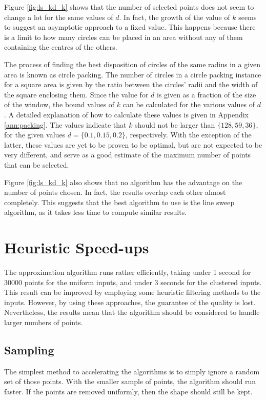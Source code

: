 \begin{change}
Figure \ref{fig:ls_kd_k} shows  that the number of selected points does not seem to change a lot for the same values of $d$. In fact, the growth of the value of $k$ seems to suggest an asymptotic approach to a fixed value. This happens because there is a limit to how many circles can be placed in an area without any of them containing the centres of the others. 
	
The process of finding the best disposition of circles of the same radius in a given area is known as circle packing. The number of circles in a circle packing instance for a square area is given by the ratio between the circles' radii and the width of the square enclosing them. Since the value for $d$ is given as a fraction of the size of the window, the bound values of $k$ can be calculated for the various values of $d$. A detailed explanation of how to calculate these values is given in Appendix \ref{ann:packing}. The values indicate that $k$ should not be larger than $\{128,59,36\}$, for the given values $d=\{0.1,0.15,0.2\}$, respectively. With the exception of the latter, these values are yet to be proven to be optimal, but are not expected to be very different, and serve as a good estimate of the maximum number of points that can be selected.
\end{change}

Figure \ref{fig:ls_kd_k} also shows that no algorithm has the advantage on the number of points chosen. In fact, the results overlap each other almost completely. This suggests that the best algorithm to use is the line sweep algorithm, as it takes less time to compute similar results.


\section{Heuristic Speed-ups}
The approximation algorithm runs rather efficiently, taking under 1 second for 30000 points for the uniform inputs, and under 3 seconds for the clustered inputs. This result can be improved by employing some heuristic filtering methods to the inputs. However, by using these approaches, the guarantee of the quality is lost. Nevertheless, the results mean that the algorithm should be considered to handle larger numbers of points.
\subsection{Sampling}
The simplest method to accelerating the algorithms is to simply ignore a random set of those points. With the smaller sample of points, the algorithm should run faster. If the points are removed uniformly, then the shape should still be kept.


